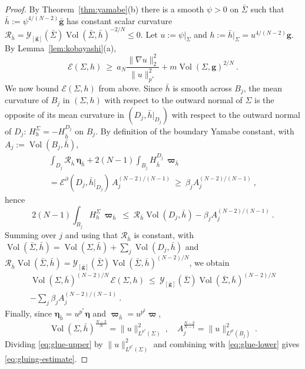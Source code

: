 \documentclass[aps,prd,reprint,amsmath,amssymb,nofootinbib,longbibliography]{revtex4-2}
\DeclareMathOperator{\Vol}{Vol}
\newcommand{\g}{\mathbf{g}}                 %
\newcommand{\gbar}{\bar{\mathbf{g}}}        %
\newcommand{\Rs}{\mathcal{R}}               %
\newcommand{\vol}{\boldsymbol{\eta}}        %
\newcommand{\bvol}{\boldsymbol{\varpi}}     %
\newcommand{\Sigbar}{\bar{\Sigma}}          %
\newcommand{\EH}{\mathcal{E}}               %
\newcommand{\EHB}{\mathcal{E}^{\partial}}   %
\newcommand{\Y}{\mathcal{Y}}                %
\newcommand{\pstar}{p^{*}}
\newcommand{\psharp}{p^{\sharp}}
\newcommand{\aN}{a_N}
\theoremstyle{plain}
\theoremstyle{definition}
\theoremstyle{remark}
\begin{document}
\begin{proof}
By Theorem~\ref{thm:yamabe}(b) there is a smooth $\psi>0$ on $\Sigbar$ such that $\bar h:=\psi^{4/(N-2)}\gbar$ has constant scalar curvature $\Rs_{\bar h}=\Y_{[\gbar]}(\Sigbar)\Vol(\Sigbar,\bar h)^{-2/N}\le0$. Let $u:=\psi|_\Sigma$ and $h:=\bar h|_\Sigma=u^{4/(N-2)}\g$. By Lemma~\ref{lem:kobayashi}(a),
\begin{equation}
\label{eq:glue-lower}
\EH(\Sigma,h)\ \ge\ \aN\frac{\|\nabla u\|^2_{2}}{\|u\|^2_{\pstar}}+m\Vol(\Sigma,\g)^{2/N}\ .
\end{equation}
We now bound $\EH(\Sigma,h)$ from above. Since $\bar h$ is smooth across $B_j$, the mean curvature of $B_j$ in $(\Sigma,h)$ with respect to the outward normal of $\Sigma$ is the opposite of its mean curvature in $(D_j,\bar h|_{D_j})$ with respect to the outward normal of $D_j$: $H^{\Sigma}_{h}=-H^{D_j}_{\bar h}$ on $B_j$. By definition of the boundary Yamabe constant, with $A_j:=\Vol(B_j,\bar h)$,
\begin{multline*}
\int_{D_j}\Rs_{\bar h}\,\vol_{\bar h}+2(N-1)\int_{B_j}H^{D_j}_{\bar h}\,\bvol_{\bar h}\\
=\EHB(D_j,\bar h|_{D_j})\,A_j^{(N-2)/(N-1)}\ \ge\ \beta_jA_j^{(N-2)/(N-1)}\ ,
\end{multline*}
hence
\begin{equation*}
2(N-1)\int_{B_j}H^{\Sigma}_h\,\bvol_{\bar h}\ \le\ \Rs_{\bar h}\Vol(D_j,\bar h)-\beta_jA_j^{(N-2)/(N-1)}\ .
\end{equation*}
Summing over $j$ and using that $\Rs_{\bar h}$ is constant, with $\Vol(\Sigbar,\bar h)=\Vol(\Sigma,\bar h)+\sum_j\Vol(D_j,\bar h)$ and $\Rs_{\bar h}\Vol(\Sigbar,\bar h)=\Y_{[\gbar]}(\Sigbar)\Vol(\Sigbar,\bar h)^{(N-2)/N}$, we obtain
\begin{multline}
\label{eq:glue-upper}
\Vol(\Sigma,\bar h)^{(N-2)/N}\,\EH(\Sigma,h)\ \le\ \Y_{[\gbar]}(\Sigbar)\Vol(\Sigbar,\bar h)^{(N-2)/N}\\
-\sum_j\beta_jA_j^{(N-2)/(N-1)}\ .
\end{multline}
Finally, since $\vol_{\bar h}=u^{\pstar}\vol$ and $\bvol_{\bar h}=u^{\psharp}\bvol$,
\begin{equation*}
\Vol(\Sigma,\bar h)^{\frac{N-2}{N}}=\|u\|^2_{L^{\pstar}(\Sigma)}\ ,\quad A_j^{\frac{N-2}{N-1}}=\|u\|^2_{L^{\psharp}(B_j)}\ .
\end{equation*}
Dividing \eqref{eq:glue-upper} by $\|u\|^2_{L^{\pstar}(\Sigma)}$ and combining with \eqref{eq:glue-lower} gives \eqref{eq:gluing-estimate}.
\end{proof}
\end{document}
